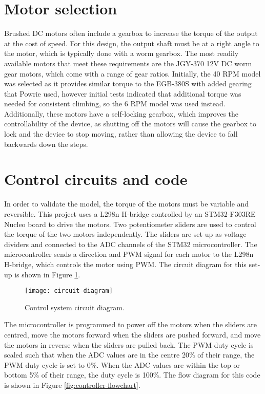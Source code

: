 \section{Motor selection}
Brushed DC motors often include a gearbox to increase the torque of the output at the cost of speed. For this design, the output shaft must be at a right angle to the motor, which is typically done with a worm gearbox. The most readily available motors that meet these requirements are the JGY-370 12V DC worm gear motors, which come with a range of gear ratios. Initially, the 40 RPM model was selected as it provides similar torque to the EGB-380S with added gearing that Powrie used, however initial tests indicated that additional torque was needed for consistent climbing, so the 6 RPM model was used instead.\\
Additionally, these motors have a self-locking gearbox, which improves the controllability of the device, as shutting off the motors will cause the gearbox to lock and the device to stop moving, rather than allowing the device to fall backwards down the steps.

\section{Control circuits and code}
In order to validate the model, the torque of the motors must be variable and reversible. This project uses a L298n H-bridge controlled by an STM32-F303RE Nucleo board to drive the motors. Two potentiometer sliders are used to control the torque of the two motors independently. The sliders are set up as voltage dividers and connected to the ADC channels of the STM32 microcontroller. The microcontroller sends a direction and PWM signal for each motor to the L298n H-bridge, which controls the motor using PWM. The circuit diagram for this set-up is shown in Figure \ref{fig:circuit-diagram}.\\

\begin{figure}[!h]
	\centering
	\texttt{[image: circuit-diagram]}
	\caption{Control system circuit diagram.}
	\label{fig:circuit-diagram}
\end{figure}

The microcontroller is programmed to power off the motors when the sliders are centred, move the motors forward when the sliders are pushed forward, and move the motors in reverse when the sliders are pulled back. The PWM duty cycle is scaled such that when the ADC values are in the centre 20\% of their range, the PWM duty cycle is set to 0\%. When the ADC values are within the top or bottom 5\% of their range, the duty cycle is 100\%. The flow diagram for this code is shown in Figure \ref{fig:controller-flowchart}.

